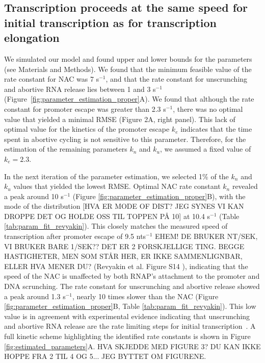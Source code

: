 %
\subsection{Transcription proceeds at the same speed for initial transcription
as for transcription elongation}

We simulated our model and found upper and lower bounds for the parameters
(see Materials and Methods). We found that the minimum feasible value of the
rate constant for NAC was 7 s$^{-1}$, and that the rate constant for
unscrunching and abortive RNA release lies between 1 and 3 s$^{-1}$
(Figure~\ref{fig:parameter_estimation_proper}A). We found that although the
rate constant for promoter escape was greater than 2.3 s$^{-1}$, there was no
optimal value that yielded a minimal RMSE (Figure 2A, right panel). This lack
of optimal value for the kinetics of the promoter escape $k_e$  indicates that
the time spent in abortive cycling is not sensitive to this parameter.
Therefore, for the estimation of the remaining parameters $k_n$ and $k_u$, we
assumed a fixed value of $k_e=2.3$.  

In the next iteration of the parameter estimation, we selected 1\% of the
$k_n$ and $k_u$ values that yielded the  lowest RMSE. Optimal NAC rate
constant $k_n$ revealed a peak around 10 s$^{-1}$ (Figure
\ref{fig:parameter_estimation_proper}B), with the mode of the distribution
[HVA ER MODE OF DIST? JEG SYNES VI KAN DROPPE DET OG HOLDE OSS TIL TOPPEN PÅ
10] at 10.4 s$^{-1}$ (Table \ref{tab:param_fit_revyakin}). This closely
matches the measured speed of transcription after promoter escape of 9.5
nts$^{-1}$ EHEM! DE BRUKER NT/SEK, VI BRUKER BARE 1/SEK?? DET ER 2
FORSKJELLIGE TING. BEGGE HASTIGHETER, MEN SOM STÅR HER, ER IKKE SAMMENLIGNBAR,
ELLER HVA MENER DU?  (Revyakin et al. Figure S14
\cite{revyakin_abortive_2006}), indicating that the speed of the NAC is
unaffected by both RNAP's attachment to the promoter and DNA scrunching. The
rate constant for unscrunching and abortive release showed a peak around 1.3
s$^{-1}$, nearly 10 times slower than the NAC (Figure
\ref{fig:parameter_estimation_proper}B, Table \ref{tab:param_fit_revyakin}).
This low value is in agreement with experimental evidence indicating that
unscrunching and abortive RNA release are the rate limiting steps for initial
transcription~\cite{revyakin_abortive_2006, margeat_direct_2006}. A full
kinetic scheme highlighting the identified rate constants is shown in Figure
\ref{fig:estimated_parameters}A. HVA SKJEDDE MED FIGURE 3? DU KAN IKKE HOPPE
FRA 2 TIL 4 OG 5...  JEG BYTTET OM FIGURENE.

